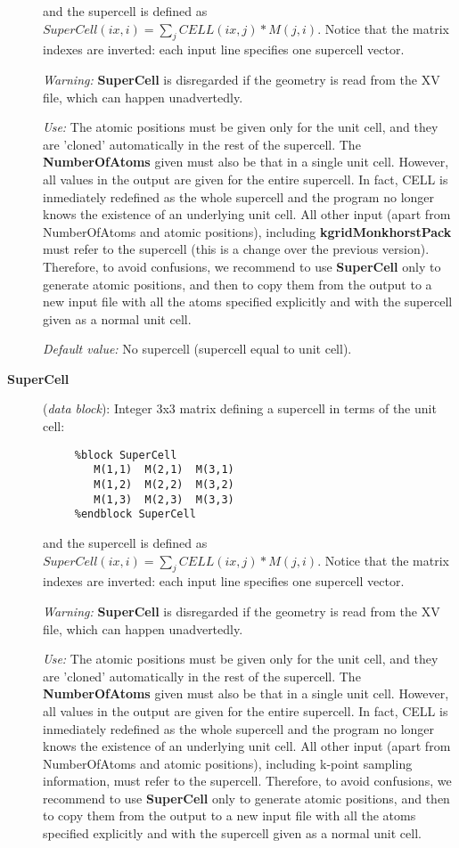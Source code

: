 \documentclass[11pt]{article}
\begin{document}
\begin{description}
and the supercell is defined as
$SuperCell(ix,i) = \sum_j CELL(ix,j)*M(j,i)$.
Notice that the matrix indexes are inverted: each input line 
specifies one supercell vector.

{\it Warning:} {\bf SuperCell} is disregarded if the geometry is read from
the XV file, which can happen unadvertedly.

{\it Use:} The atomic positions must be given only for the unit cell,
and they are 'cloned' automatically in the rest of the supercell.
The {\bf NumberOfAtoms} given must also be that in a single unit cell.
However, all values in the output are given for the entire supercell. 
In fact, CELL is inmediately redefined as the whole supercell and the 
program no longer knows the existence of an underlying unit cell.
All other input (apart from NumberOfAtoms and atomic positions), 
including {\bf kgridMonkhorstPack} must refer to the supercell 
(this is a change over the previous version). Therefore, to avoid
confusions, we recommend to use {\bf SuperCell} only to
generate atomic positions, and then to copy them from the output
to a new input file with all the atoms specified explicitly and
with the supercell given as a normal unit cell.

{\it Default value:} No supercell (supercell equal to unit cell).


\item[{\bf SuperCell}] ({\it data block}): 
Integer 3x3 matrix defining a supercell in terms of the unit cell: 

\begin{verbatim}
     %block SuperCell
        M(1,1)  M(2,1)  M(3,1) 
        M(1,2)  M(2,2)  M(3,2) 
        M(1,3)  M(2,3)  M(3,3) 
     %endblock SuperCell
\end{verbatim}

and the supercell is defined as
$SuperCell(ix,i) = \sum_j CELL(ix,j)*M(j,i)$.
Notice that the matrix indexes are inverted: each input line 
specifies one supercell vector.

{\it Warning:} {\bf SuperCell} is disregarded if the geometry is read from
the XV file, which can happen unadvertedly.

{\it Use:} The atomic positions must be given only for the unit cell,
and they are 'cloned' automatically in the rest of the supercell.  The
{\bf NumberOfAtoms} given must also be that in a single unit cell.
However, all values in the output are given for the entire supercell.
In fact, CELL is inmediately redefined as the whole supercell and the
program no longer knows the existence of an underlying unit cell.  All
other input (apart from NumberOfAtoms and atomic positions), including
k-point sampling information, must refer to the supercell. Therefore,
to avoid confusions, we recommend to use {\bf SuperCell} only to
generate atomic positions, and then to copy them from the output to a
new input file with all the atoms specified explicitly and with the
supercell given as a normal unit cell.


\end{description}
\end{document}
